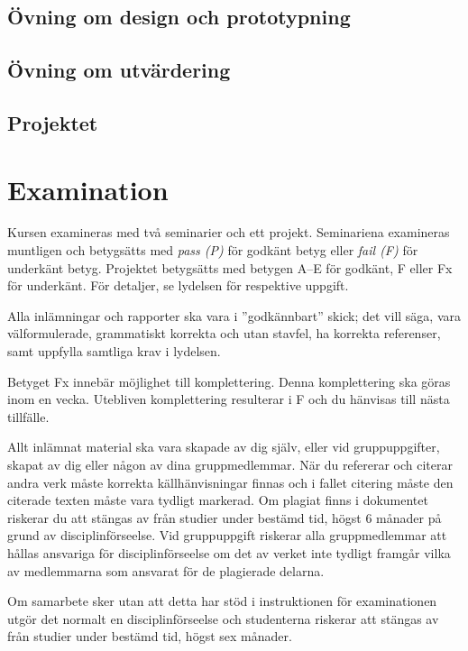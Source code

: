 \documentclass[a4paper,logo]{miunart}
\begin{document}
\subsection{Övning om design och prototypning}


\subsection{Övning om utvärdering}


\subsection{Projektet}



\section{Examination}

Kursen examineras med två seminarier och ett projekt.
Seminariena examineras muntligen och betygsätts med \emph{pass (P)} för godkänt 
betyg eller \emph{fail (F)} för underkänt betyg.
Projektet betygsätts med betygen A--E för godkänt, F eller Fx för underkänt.
För detaljer, se lydelsen för respektive uppgift.

Alla inlämningar och rapporter ska vara i ''godkännbart'' skick; det vill säga, 
vara välformulerade, grammatiskt korrekta och utan stavfel, ha korrekta 
referenser, samt uppfylla samtliga krav i lydelsen.

Betyget Fx innebär möjlighet till komplettering.
Denna komplettering ska göras inom en vecka.
Utebliven komplettering resulterar i F och du hänvisas till nästa tillfälle.

Allt inlämnat material ska vara skapade av dig själv, eller vid gruppuppgifter, 
skapat av dig eller någon av dina gruppmedlemmar.
När du refererar och citerar andra verk måste korrekta källhänvisningar finnas 
och i fallet citering måste den citerade texten måste vara tydligt markerad.
Om plagiat finns i dokumentet riskerar du att stängas av från studier under 
bestämd tid, högst 6 månader på grund av disciplinförseelse.
Vid gruppuppgift riskerar alla gruppmedlemmar att hållas ansvariga
för disciplinförseelse om det av verket inte tydligt framgår vilka av
medlemmarna som ansvarat för de plagierade delarna.

Om samarbete sker utan att detta har stöd i instruktionen för examinationen
utgör det normalt en disciplinförseelse och studenterna riskerar att
stängas av från studier under bestämd tid, högst sex månader.
\end{document}
